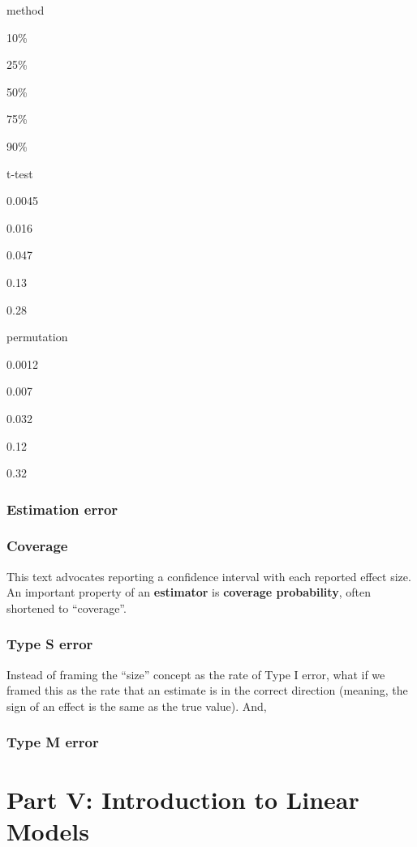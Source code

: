 \documentclass[]{book}
\begin{document}
method

10\%

25\%

50\%

75\%

90\%

t-test

0.0045

0.016

0.047

0.13

0.28

permutation

0.0012

0.007

0.032

0.12

0.32

\hypertarget{estimation-error}{%
\subsection{Estimation error}\label{estimation-error}}

\hypertarget{coverage}{%
\subsection{Coverage}\label{coverage}}

This text advocates reporting a confidence interval with each reported effect size. An important property of an \textbf{estimator} is \textbf{coverage probability}, often shortened to ``coverage''.

\hypertarget{type-s-error}{%
\subsection{Type S error}\label{type-s-error}}

Instead of framing the ``size'' concept as the rate of Type I error, what if we framed this as the rate that an estimate is in the correct direction (meaning, the sign of an effect is the same as the true value). And,

\hypertarget{type-m-error}{%
\subsection{Type M error}\label{type-m-error}}

\hypertarget{part-v-introduction-to-linear-models}{%
\chapter*{Part V: Introduction to Linear Models}\label{part-v-introduction-to-linear-models}}
\end{document}
